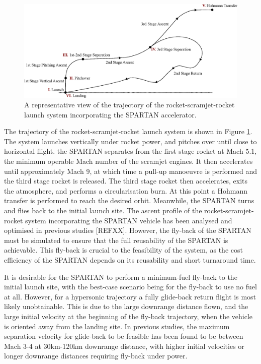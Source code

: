\documentclass[conf]{new-aiaa}
\begin{document}
\begin{figure}
\centering
\includegraphics[width=0.9\linewidth]{Figures/Traj}
\caption{A representative view of the trajectory of the rocket-scramjet-rocket launch system incorporating the SPARTAN accelerator.}
\label{fig:Traj}
\end{figure}


The trajectory of the rocket-scramjet-rocket launch system is shown in Figure \ref{fig:Traj}. The system launches vertically under rocket power, and pitches over until close to horizontal flight. the SPARTAN separates from the first stage rocket at Mach 5.1, the minimum operable Mach number of the scramjet engines. It then accelerates until approximately Mach 9, at which time a pull-up manoeuvre is performed and the third stage rocket is released. The third stage rocket then accelerates, exits the atmosphere, and performs a circularisation burn. At this point a Hohmann transfer is performed to reach the desired orbit. Meanwhile, the SPARTAN turns and flies back to the initial launch site.
The ascent profile of the rocket-scramjet-rocket system incorporating the SPARTAN vehicle has been analysed and optimised in previous studies [REFXX]. However, the fly-back of the SPARTAN must be simulated to ensure that the full reusability of the SPARTAN is achievable. This fly-back is crucial to the feasibility of the system, as the cost efficiency of the SPARTAN depends on its reusability and short turnaround time.

It is desirable for the SPARTAN to perform a minimum-fuel fly-back to the initial launch site, with the best-case scenario being for the fly-back to use no fuel at all.
 However, for a hypersonic trajectory a fully glide-back return flight is most likely unobtainable. This is due to the large downrange distance flown, and the large initial velocity at the beginning of the fly-back trajectory, when the vehicle is oriented away from the landing site.
In previous studies, the maximum separation velocity for glide-back to be feasible has been found to be between Mach 3-4 at 30km-120km downrange distance, with higher initial velocities or longer downrange distances requiring fly-back under power\cite{Hellman,Tetlow1992}.
\end{document}
